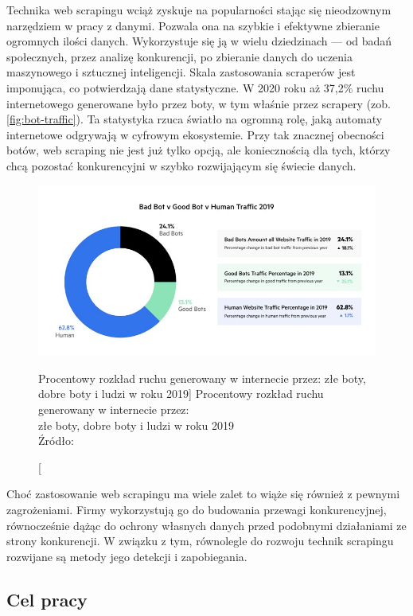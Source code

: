 Technika web scrapingu wciąż zyskuje na popularności stając się nieodzownym narzędziem w pracy z danymi.
Pozwala ona na szybkie i efektywne zbieranie ogromnych ilości danych.
Wykorzystuje się ją w wielu dziedzinach --- od badań społecznych, przez analizę konkurencji, po zbieranie danych do uczenia maszynowego i sztucznej inteligencji.
Skala zastosowania scraperów jest imponująca, co potwierdzają dane statystyczne.
W 2020 roku aż 37,2\% ruchu internetowego generowane było przez boty, w tym właśnie przez scrapery (zob. \autoref{fig:bot-traffic}).
Ta statystyka rzuca światło na ogromną rolę, jaką automaty internetowe odgrywają w cyfrowym ekosystemie.
Przy tak znacznej obecności botów, web scraping nie jest już tylko opcją, ale koniecznością dla tych, którzy chcą pozostać konkurencyjni w szybko rozwijającym się świecie danych.

\begin{figure}[H]
    \centering
    \captionsetup{width=.8\linewidth}
    \includegraphics[width=\textwidth]{img/bot-traffic}
    \caption
        [Procentowy rozkład ruchu generowany w internecie przez: złe boty, dobre boty i ludzi w roku 2019]
        {Procentowy rozkład ruchu generowany w internecie przez:\\ złe boty, dobre boty i ludzi w roku 2019\\Źródło: ~\cite{bot-traffic}}
    \label{fig:bot-traffic}
\end{figure}

Choć zastosowanie web scrapingu ma wiele zalet to wiąże się również z pewnymi zagrożeniami.
Firmy wykorzystują go do budowania przewagi konkurencyjnej, równocześnie dążąc do ochrony własnych danych przed podobnymi działaniami ze strony konkurencji.
W związku z tym, równolegle do rozwoju technik scrapingu rozwijane są metody jego detekcji i zapobiegania.

\subsection{Cel pracy}\label{subsec:cel-pracy}

